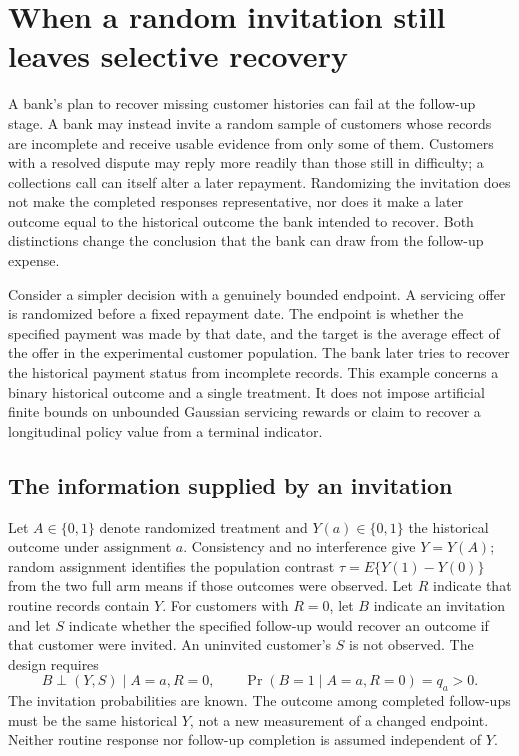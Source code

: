\chapter{When a random invitation still leaves selective recovery}
\label{rel73:partial-recovery}

A bank's plan to recover missing customer histories can fail at the follow-up stage. A bank may instead invite a random sample
of customers whose records are incomplete and receive usable evidence from
only some of them. Customers with a resolved dispute may reply more readily
than those still in difficulty; a collections call can itself alter a later
repayment. Randomizing the invitation does not make the completed responses
representative, nor does it make a later outcome equal to the historical
outcome the bank intended to recover. Both distinctions change the conclusion
that the bank can draw from the follow-up expense.

Consider a simpler decision with a genuinely bounded endpoint. A servicing
offer is randomized before a fixed repayment date. The endpoint is whether
the specified payment was made by that date, and the target is the average
effect of the offer in the experimental customer population. The bank later
tries to recover the historical payment status from incomplete records. This
example concerns a binary historical outcome and a single treatment. It does
not impose artificial finite bounds on unbounded Gaussian servicing rewards
or claim to recover a longitudinal policy value from a terminal indicator.

\section{The information supplied by an invitation}

Let $A\in\{0,1\}$ denote randomized treatment and $Y(a)\in\{0,1\}$ the
historical outcome under assignment $a$. Consistency and no interference give
$Y=Y(A)$; random assignment identifies the population contrast
$\tau=E\{Y(1)-Y(0)\}$ from the two full arm means if those outcomes were
observed. Let $R$ indicate that routine records contain $Y$. For customers
with $R=0$, let $B$ indicate an invitation and let $S$ indicate whether the
specified follow-up would recover an outcome if that customer were invited.
An uninvited customer's $S$ is not observed. The design requires
\[
 B\mathbin{\perp}(Y,S)\mid A=a,R=0,\qquad
 \Pr(B=1\mid A=a,R=0)=q_a>0.
\]
The invitation probabilities are known. The outcome among completed
follow-ups must be the same historical $Y$, not a new measurement of a
changed endpoint. Neither routine response nor follow-up completion is
assumed independent of $Y$.


